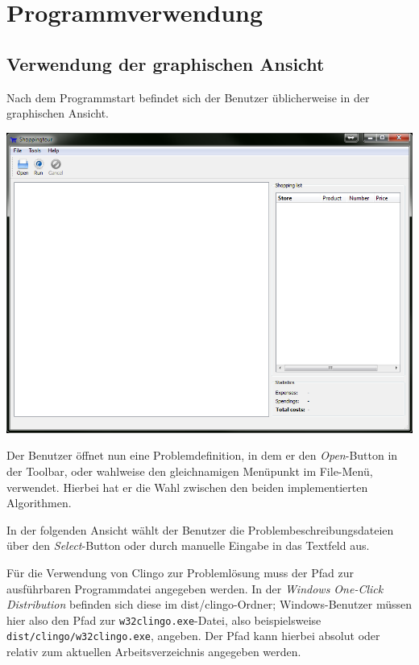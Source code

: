 \newpage

\section{Programmverwendung}


\subsection{Verwendung der graphischen Ansicht}

Nach dem Programmstart befindet sich der Benutzer üblicherweise in der graphischen Ansicht.

\includegraphics[width=1\textwidth]{resourcen/walkthrough/0-default-view.png}

\newpage

Der Benutzer öffnet nun eine Problemdefinition, in dem er den \emph{Open}-Button in der Toolbar, oder wahlweise den gleichnamigen Menüpunkt im File-Menü, verwendet. Hierbei hat er die Wahl zwischen den beiden implementierten Algorithmen.

In der folgenden Ansicht wählt der Benutzer die Problembeschreibungsdateien über den \emph{Select}-Button oder durch manuelle Eingabe in das Textfeld aus.

Für die Verwendung von Clingo zur Problemlösung muss der Pfad zur ausführbaren Programmdatei angegeben werden. In der \emph{Windows One-Click Distribution} befinden sich diese im dist/clingo-Ordner; Windows-Benutzer müssen hier also den Pfad zur \texttt{w32clingo.exe}-Datei, also beispielsweise \texttt{dist/clingo/w32clingo.exe}, angeben. Der Pfad kann hierbei absolut oder relativ zum aktuellen Arbeitsverzeichnis angegeben werden.

